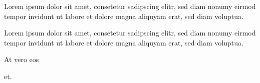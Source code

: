


Lorem ipsum dolor sit amet, consetetur sadipscing elitr, sed
diam nonumy eirmod tempor invidunt ut labore et dolore magna aliquyam
erat, sed diam voluptua.


\clozeparcapture Lorem ipsum dolor sit amet, consetetur sadipscing
elitr, sed diam nonumy eirmod tempor invidunt ut labore et dolore magna
aliquyam erat, sed diam voluptua.


At vero \clozeparcapture eos \par et.

\bye
